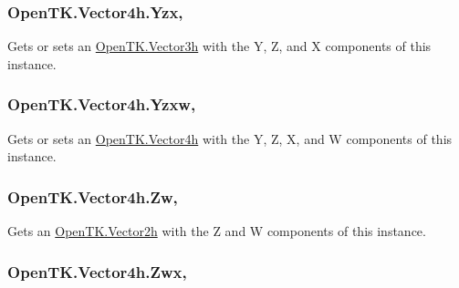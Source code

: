 \hypertarget{struct_open_t_k_1_1_vector4h_a22da4d4a54c0d882aac3dc3fdae4172c}{
\subsubsection[{Yzx}]{ Open\-T\-K.\-Vector4h.\-Yzx\hspace{0.3cm}{\ttfamily [get]}, {\ttfamily [set]}}}\label{struct_open_t_k_1_1_vector4h_a22da4d4a54c0d882aac3dc3fdae4172c}


Gets or sets an \hyperlink{struct_open_t_k_1_1_vector3h}{Open\-T\-K.\-Vector3h} with the Y, Z, and X components of this instance. 

\hypertarget{struct_open_t_k_1_1_vector4h_aa351dd8bef6a4ebf9305beedcff274ec}{
\subsubsection[{Yzxw}]{ Open\-T\-K.\-Vector4h.\-Yzxw\hspace{0.3cm}{\ttfamily [get]}, {\ttfamily [set]}}}\label{struct_open_t_k_1_1_vector4h_aa351dd8bef6a4ebf9305beedcff274ec}


Gets or sets an \hyperlink{struct_open_t_k_1_1_vector4h}{Open\-T\-K.\-Vector4h} with the Y, Z, X, and W components of this instance. 

\hypertarget{struct_open_t_k_1_1_vector4h_a07a710f867a88adaceeb17282f683d78}{
\subsubsection[{Zw}]{ Open\-T\-K.\-Vector4h.\-Zw\hspace{0.3cm}{\ttfamily [get]}, {\ttfamily [set]}}}\label{struct_open_t_k_1_1_vector4h_a07a710f867a88adaceeb17282f683d78}


Gets an \hyperlink{struct_open_t_k_1_1_vector2h}{Open\-T\-K.\-Vector2h} with the Z and W components of this instance. 

\hypertarget{struct_open_t_k_1_1_vector4h_aa144fa39ac5d4c276f8e50dd7fb32a33}{
\subsubsection[{Zwx}]{ Open\-T\-K.\-Vector4h.\-Zwx\hspace{0.3cm}{\ttfamily [get]}, {\ttfamily [set]}}}\label{struct_open_t_k_1_1_vector4h_aa144fa39ac5d4c276f8e50dd7fb32a33}


